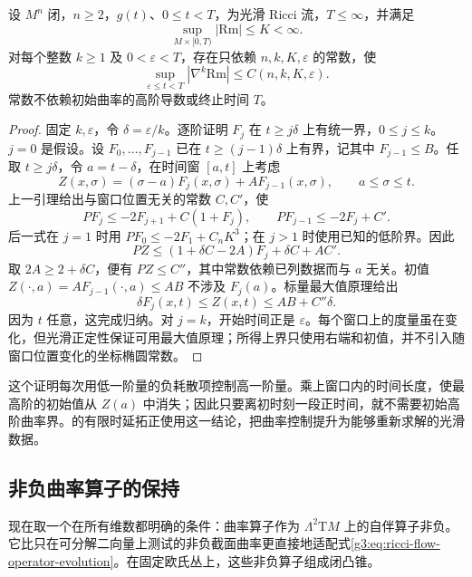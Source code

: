 \begin{theorem}\label{g3:thm:ricci-flow-curvature-derivatives}
	设 \(M^n\) 闭，\(n\ge2\)，\(g(t)\)、\(0\le t<T\)，为光滑 Ricci 流，\(T\le\infty\)，并满足
	\[
		\sup_{M\times[0,T)}|\mathrm{Rm}|\le K<\infty.
	\]
	对每个整数 \(k\ge1\) 及 \(0<\varepsilon<T\)，存在只依赖 \(n,k,K,\varepsilon\) 的常数，使
	\begin{equation}\label{g3:eq:ricci-flow-positive-time-derivative-bound}
		\sup_{\varepsilon\le t<T}|\nabla^k\mathrm{Rm}|\le C(n,k,K,\varepsilon).
	\end{equation}
	常数不依赖初始曲率的高阶导数或终止时间 \(T\)。
\end{theorem}
\begin{proof}
	固定 \(k,\varepsilon\)，令 \(\delta=\varepsilon/k\)。逐阶证明 \(F_j\) 在 \(t\ge j\delta\) 上有统一界，\(0\le j\le k\)。\(j=0\) 是假设。设 \(F_0,\ldots,F_{j-1}\) 已在 \(t\ge(j-1)\delta\) 上有界，记其中 \(F_{j-1}\le B\)。任取 \(t\ge j\delta\)，令 \(a=t-\delta\)，在时间窗 \([a,t]\) 上考虑
	\[
		Z(x,\sigma)=(\sigma-a)F_j(x,\sigma)+A F_{j-1}(x,\sigma),
		\qquad a\le\sigma\le t.
	\]
	上一引理给出与窗口位置无关的常数 \(C,C'\)，使
	\[
		PF_j\le-2F_{j+1}+C(1+F_j),\qquad
		PF_{j-1}\le-2F_j+C'.
	\]
	后一式在 \(j=1\) 时用 \(PF_0\le-2F_1+C_nK^3\)；在 \(j>1\) 时使用已知的低阶界。因此
	\[
		PZ\le(1+\delta C-2A)F_j+\delta C+AC'.
	\]
	取 \(2A\ge2+\delta C\)，便有 \(PZ\le C''\)，其中常数依赖已列数据而与 \(a\) 无关。初值 \(Z(\cdot,a)=AF_{j-1}(\cdot,a)\le AB\) 不涉及 \(F_j(a)\)。标量最大值原理给出
	\[
		\delta F_j(x,t)\le Z(x,t)\le AB+C''\delta.
	\]
	因为 \(t\) 任意，这完成归纳。对 \(j=k\)，开始时间正是 \(\varepsilon\)。每个窗口上的度量虽在变化，但光滑正定性保证可用最大值原理；所得上界只使用右端和初值，并不引入随窗口位置变化的坐标椭圆常数。
\end{proof}

这个证明每次用低一阶量的负耗散项控制高一阶量。乘上窗口内的时间长度，使最高阶的初始值从 \(Z(a)\) 中消失；因此只要离初时刻一段正时间，就不需要初始高阶曲率界。的有限时延拓正使用这一结论，把曲率控制提升为能够重新求解的光滑数据。

\subsection{非负曲率算子的保持}
\label{g3:subsec:2703:04}
现在取一个在所有维数都明确的条件：曲率算子作为 \(\Lambda^2\mathrm TM\) 上的自伴算子非负。它比只在可分解二向量上测试的非负截面曲率更直接地适配式\eqref{g3:eq:ricci-flow-operator-evolution}。在固定欧氏丛上，这些非负算子组成闭凸锥。

